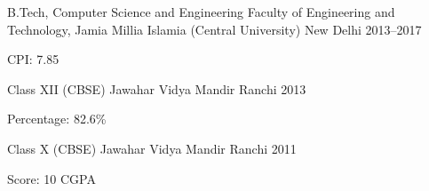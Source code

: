 
\begin{cventries}

\cventry%
  {B.Tech, Computer Science and Engineering} %
  {Faculty of Engineering and Technology, Jamia Millia Islamia (Central
   University)} %
  {New Delhi} %
  {2013--2017} %
  {%
    \begin{cvitems}%
      \item{CPI: 7.85}
    \end{cvitems}
  }

\cventry%
  {Class XII (CBSE)} %
  {Jawahar Vidya Mandir} %
  {Ranchi} %
  {2013} %
  {%
    \begin{cvitems} %
      \item{Percentage: 82.6\%}
    \end{cvitems}
  }

\cventry%
  {Class X (CBSE)} %
  {Jawahar Vidya Mandir} %
  {Ranchi} %
  {2011} %
  {%
    \begin{cvitems} %
      \item{Score: 10 CGPA}
    \end{cvitems}
  }

\end{cventries}
